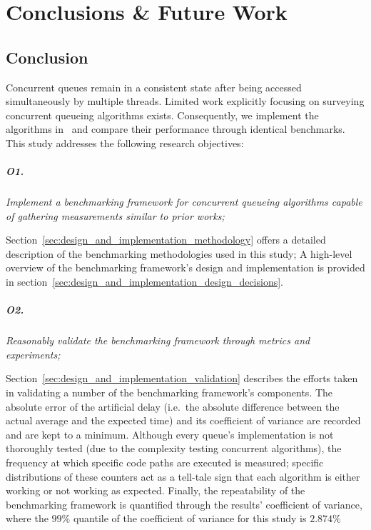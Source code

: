 \chapter{Conclusions \& Future Work}
\section{Conclusion}
Concurrent queues remain in a consistent state after being accessed
simultaneously by multiple threads. Limited work explicitly focusing on surveying concurrent
queueing algorithms exists. Consequently, we implement the algorithms
in~\citep{michael1996simple,hoffman2007baskets,valois1994queues} and compare
their performance through identical benchmarks. This study addresses the following research
objectives:

\paragraph{O1.} \emph{Implement a benchmarking framework for concurrent
queueing algorithms capable of gathering measurements similar to prior works;}

Section~\ref{sec:design_and_implementation_methodology} offers a detailed
description of the benchmarking methodologies used in this study; A high-level
overview of the benchmarking framework's design and implementation is provided in
section~\ref{sec:design_and_implementation_design_decisions}.

\paragraph{O2.} \emph{Reasonably validate the benchmarking framework through
metrics and experiments;}

Section~\ref{sec:design_and_implementation_validation} describes the efforts
taken in validating a number of the benchmarking framework's components.
The absolute error of the artificial delay (i.e.~the absolute difference
between the actual average and the expected time) and its coefficient of
variance are recorded and are kept to a minimum.
Although every queue's implementation is not thoroughly tested (due to the
complexity testing concurrent algorithms), the frequency at which specific code
paths are executed is measured; specific distributions of these counters act as
a tell-tale sign that each algorithm is either working or not working as
expected. Finally, the repeatability of the benchmarking framework is
quantified through the results' coefficient of variance, where the $99\%$
quantile of the coefficient of variance for this study is $2.874\%$


